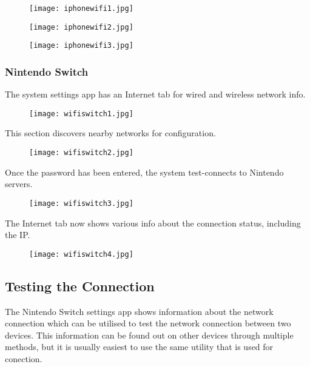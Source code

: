 \documentclass[11pt]{amsart}
\begin{document}
\begin{figure}[h]{}
\centering\texttt{[image: iphonewifi1.jpg]}
\caption{}

\end{figure}

\begin{figure}[h]{}
\centering\texttt{[image: iphonewifi2.jpg]}
\caption{}

\end{figure}

\begin{figure}[h]{}
\centering\texttt{[image: iphonewifi3.jpg]}
\caption{}

\end{figure}

\hypertarget{x-nintendo-switch}{\subsubsection*{Nintendo Switch}}
The system settings app has an Internet tab for wired and wireless network info.


\begin{figure}[h]{}
\centering\texttt{[image: wifiswitch1.jpg]}


\end{figure}

This section discovers nearby networks for configuration.


\begin{figure}[h]{}
\centering\texttt{[image: wifiswitch2.jpg]}


\end{figure}

Once the password has been entered, the system test-connects to Nintendo servers.


\begin{figure}[h]{}
\centering\texttt{[image: wifiswitch3.jpg]}


\end{figure}

The Internet tab now shows various info about the connection status, including the IP.


\begin{figure}[h]{}
\centering\texttt{[image: wifiswitch4.jpg]}


\end{figure}

\hypertarget{x-testing-the-connection}{\subsection*{Testing the Connection}}
The Nintendo Switch settings app shows information about the network connection which can be utilised to test the network connection between two devices. This information can be found out on other devices through multiple methods, but it is usually easiest to use the same utility that is used for conection.
\end{document}
